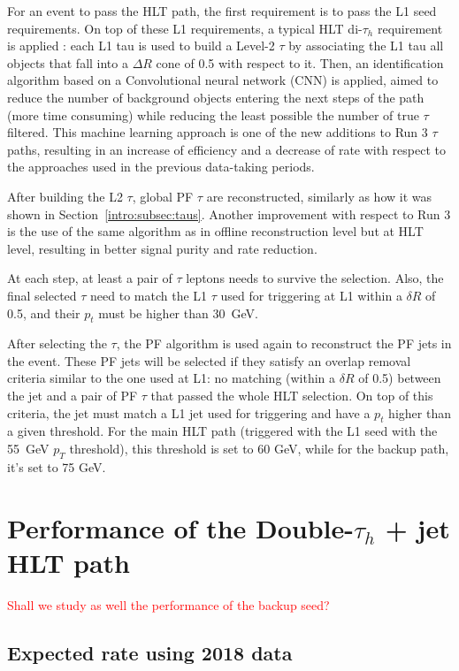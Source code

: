 \documentclass[../main.tex]{subfiles}
\begin{document}
For an event to pass the HLT path, the first requirement is to pass the L1 seed requirements. On top of these L1 requirements, a typical HLT di-$\tau_h$ requirement is applied \cite{intro:exp:cms_trigger}: each L1 tau is used to build a Level-2 $\tau$ by associating the L1 tau all objects that fall into a $\Delta R$ cone of 0.5 with respect to it. Then, an identification algorithm based on a Convolutional neural network (CNN) is applied, aimed to reduce the number of background objects entering the next steps of the path (more time consuming) while reducing the least possible the number of true $\tau$ filtered. This machine learning approach is one of the new additions to Run 3 $\tau$ paths, resulting in an increase of efficiency and a decrease of rate with respect to the approaches used in the previous data-taking periods. 

After building the L2 $\tau$, global PF $\tau$ are reconstructed, similarly as how it was shown in Section~\ref{intro:subsec:taus}. Another improvement with respect to Run 3 is the use of the same \deeptau algorithm as in offline reconstruction level but at HLT level, resulting in better signal purity and rate reduction.

At each step, at least a pair of $\tau$ leptons needs to survive the selection. Also, the final selected $\tau$ need to match the L1 $\tau$ used for triggering at L1 within a $\delta R$ of 0.5, and their $p_t$ must be higher than 30~GeV.

After selecting the $\tau$, the PF algorithm is used again to reconstruct the PF jets in the event. These PF jets will be selected if they satisfy an overlap removal criteria similar to the one used at L1: no matching (within a $\delta R$ of 0.5) between the jet and a pair of PF $\tau$ that passed the whole HLT selection. On top of this criteria, the jet must match a L1 jet used for triggering and have a $p_t$ higher than a given threshold. For the main HLT path (triggered with the L1 seed with the 55~GeV $p_T$ threshold), this threshold is set to 60 GeV, while for the backup path, it's set to 75 GeV.

\section{Performance of the Double-$\tau_h$ + jet HLT path}

\textcolor{red}{Shall we study as well the performance of the backup seed?}

\subsection{Expected rate using 2018 data}
\end{document}
